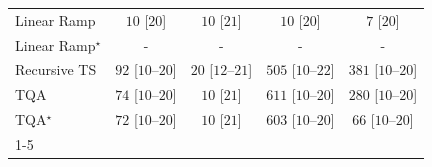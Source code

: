 \begin{tabular}{l|cccc|}
Linear Ramp & {\cellcolor[HTML]{F7FCF5}} \color[HTML]{000000} $10$ [$20$] & {\cellcolor[HTML]{F7FCF5}} \color[HTML]{000000} $10$ [$21$] & {\cellcolor[HTML]{F7FCF5}} \color[HTML]{000000} $10$ [$20$] & {\cellcolor[HTML]{F7FCF5}} \color[HTML]{000000} $7$ [$20$] \\
Linear Ramp$^\star$ & {\cellcolor[HTML]{000000}} \color[HTML]{F1F1F1} {\cellcolor{white}} \color{black} - & {\cellcolor[HTML]{000000}} \color[HTML]{F1F1F1} {\cellcolor{white}} \color{black} - & {\cellcolor[HTML]{000000}} \color[HTML]{F1F1F1} {\cellcolor{white}} \color{black} - & {\cellcolor[HTML]{000000}} \color[HTML]{F1F1F1} {\cellcolor{white}} \color{black} - \\
Recursive TS & {\cellcolor[HTML]{E8F6E4}} \color[HTML]{000000} $92$ [$10$--$20$] & {\cellcolor[HTML]{F5FBF2}} \color[HTML]{000000} $20$ [$12$--$21$] & {\cellcolor[HTML]{48AE60}} \color[HTML]{F1F1F1} $505$ [$10$--$22$] & {\cellcolor[HTML]{84CC83}} \color[HTML]{000000} $381$ [$10$--$20$] \\
TQA & {\cellcolor[HTML]{ECF8E8}} \color[HTML]{000000} $74$ [$10$--$20$] & {\cellcolor[HTML]{F7FCF5}} \color[HTML]{000000} $10$ [$21$] & {\cellcolor[HTML]{268E47}} \color[HTML]{F1F1F1} $611$ [$10$--$20$] & {\cellcolor[HTML]{AEDEA7}} \color[HTML]{000000} $280$ [$10$--$20$] \\
TQA$^\star$ & {\cellcolor[HTML]{ECF8E8}} \color[HTML]{000000} $72$ [$10$--$20$] & {\cellcolor[HTML]{F7FCF5}} \color[HTML]{000000} $10$ [$21$] & {\cellcolor[HTML]{29914A}} \color[HTML]{F1F1F1} $603$ [$10$--$20$] & {\cellcolor[HTML]{EDF8E9}} \color[HTML]{000000} $66$ [$10$--$20$] \\
\cline{1-5}
\bottomrule
\end{tabular}
